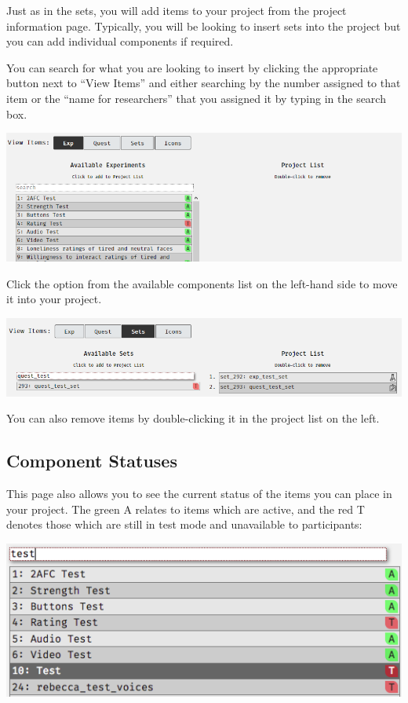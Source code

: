 \documentclass[]{book}
\begin{document}
Just as in the sets, you will add items to your project from the project
information page. Typically, you will be looking to insert sets into the
project but you can add individual components if required.

You can search for what you are looking to insert by clicking the
appropriate button next to ``View Items'' and either searching by the
number assigned to that item or the ``name for researchers'' that you
assigned it by typing in the search box.

\includegraphics{images/screenshots/proj_6.png}

Click the option from the available components list on the left-hand
side to move it into your project.

\includegraphics{images/screenshots/proj_7.png}

You can also remove items by double-clicking it in the project list on
the left.

\subsection*{Component Statuses}\label{component-statuses-1}

This page also allows you to see the current status of the items you can
place in your project. The green A relates to items which are active,
and the red T denotes those which are still in test mode and unavailable
to participants:

\includegraphics{images/screenshots/proj_8.png}
\end{document}
